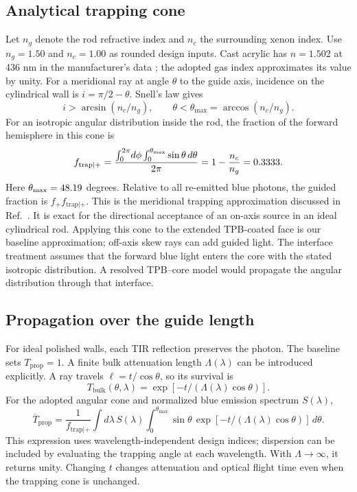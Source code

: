 \documentclass[11pt,a4paper]{article}
\newcommand{\num}[2][3]{\pgfmathprintnumber[fixed,precision=#1,fixed zerofill]{#2}}
\begin{document}
\subsection{Analytical trapping cone}
Let $n_g$ denote the rod refractive index and $n_c$ the surrounding xenon
index. Use $n_g=1.50$ and $n_c=1.00$ as rounded design inputs. Cast acrylic
has $n=1.502$ at 436 nm in the manufacturer's data \cite{EljenAcrylicGuide};
the adopted gas index approximates its value by unity.
For a meridional ray at angle $\theta$ to the guide axis, incidence on the
cylindrical wall is $i=\pi/2-\theta$. Snell's law gives
\begin{equation}
 i>\arcsin(n_c/n_g),\qquad
 \theta<\theta_{\max}=\arccos(n_c/n_g).
\end{equation}
For an isotropic angular distribution inside the rod, the fraction of the
forward hemisphere in this cone is
\begin{equation}
 f_{\mathrm{trap}|+}
 =\frac{\int_0^{2\pi}\!d\phi\int_0^{\theta_{\max}}\sin\theta\,d\theta}{2\pi}
 =1-\frac{n_c}{n_g}=\num[4]{\elmCapture}.
 \label{eq:trap}
\end{equation}
Here $\theta_{\max}=\num[2]{\elmTrappingAngleDeg}$ degrees. Relative to all
re-emitted blue photons, the guided fraction is $f_+f_{\mathrm{trap}|+}$.
This is the meridional trapping approximation discussed in
Ref.~\cite{Papandreou2007Trapping}. It is exact for the directional acceptance
of an on-axis source in an ideal cylindrical rod. Applying this cone to the
extended TPB-coated face is our baseline approximation; off-axis skew rays
can add guided light. The interface treatment assumes that the forward blue
light enters the core with the stated isotropic distribution. A resolved
TPB--core model would propagate the angular distribution through that interface.

\subsection{Propagation over the guide length}
For ideal polished walls, each TIR reflection preserves the photon. The
baseline sets $T_{\mathrm{prop}}=1$. A finite bulk attenuation length
$\Lambda(\lambda)$ can be introduced explicitly. A ray travels
$\ell=t/\cos\theta$, so its survival is
\begin{equation}
 T_{\mathrm{bulk}}(\theta,\lambda)
 =\exp[-t/(\Lambda(\lambda)\cos\theta)].
\end{equation}
For the adopted angular cone and normalized blue emission spectrum $S(\lambda)$,
\begin{equation}
 \overline T_{\mathrm{prop}}
 =\frac{1}{f_{\mathrm{trap}|+}}
 \int d\lambda\,S(\lambda)
 \int_0^{\theta_{\max}}\sin\theta\,
 \exp[-t/(\Lambda(\lambda)\cos\theta)]\,d\theta.
 \label{eq:attenuation}
\end{equation}
This expression uses wavelength-independent design indices; dispersion can
be included by evaluating the trapping angle at each wavelength. With
$\Lambda\to\infty$, it returns unity. Changing $t$ changes attenuation and
optical flight time even when the trapping cone is unchanged.
\end{document}
